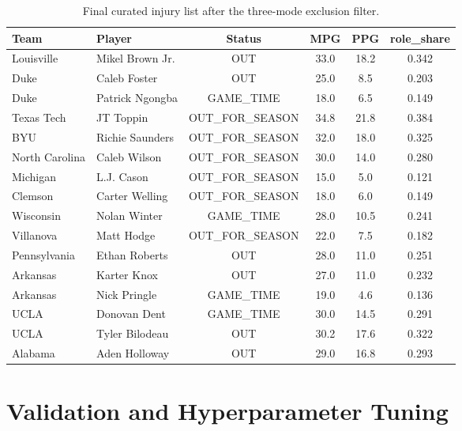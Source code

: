 \documentclass[11pt, a4paper]{article}
\begin{document}
\begin{table}[H]
\centering
\small
\begin{tabular}{@{}llcccc@{}}
\toprule
\textbf{Team} & \textbf{Player} & \textbf{Status} & \textbf{MPG} & \textbf{PPG} & \textbf{role\_share} \\
\midrule
Louisville     & Mikel Brown Jr.    & OUT            & 33.0 & 18.2 & 0.342 \\
Duke           & Caleb Foster       & OUT            & 25.0 & 8.5  & 0.203 \\
Duke           & Patrick Ngongba    & GAME\_TIME     & 18.0 & 6.5  & 0.149 \\
Texas Tech     & JT Toppin          & OUT\_FOR\_SEASON & 34.8 & 21.8 & 0.384 \\
BYU            & Richie Saunders    & OUT\_FOR\_SEASON & 32.0 & 18.0 & 0.325 \\
North Carolina & Caleb Wilson       & OUT\_FOR\_SEASON & 30.0 & 14.0 & 0.280 \\
Michigan       & L.J. Cason         & OUT\_FOR\_SEASON & 15.0 & 5.0  & 0.121 \\
Clemson        & Carter Welling     & OUT\_FOR\_SEASON & 18.0 & 6.0  & 0.149 \\
Wisconsin      & Nolan Winter       & GAME\_TIME     & 28.0 & 10.5 & 0.241 \\
Villanova      & Matt Hodge         & OUT\_FOR\_SEASON & 22.0 & 7.5  & 0.182 \\
Pennsylvania   & Ethan Roberts      & OUT            & 28.0 & 11.0 & 0.251 \\
Arkansas       & Karter Knox        & OUT            & 27.0 & 11.0 & 0.232 \\
Arkansas       & Nick Pringle       & GAME\_TIME     & 19.0 & 4.6  & 0.136 \\
UCLA           & Donovan Dent       & GAME\_TIME     & 30.0 & 14.5 & 0.291 \\
UCLA           & Tyler Bilodeau     & OUT            & 30.2 & 17.6 & 0.322 \\
Alabama        & Aden Holloway      & OUT            & 29.0 & 16.8 & 0.293 \\
\bottomrule
\end{tabular}
\caption{Final curated injury list after the three-mode exclusion filter.}
\label{tab:injuries}
\end{table}

\section{Validation and Hyperparameter Tuning}
\label{sec:validation}
\end{document}
